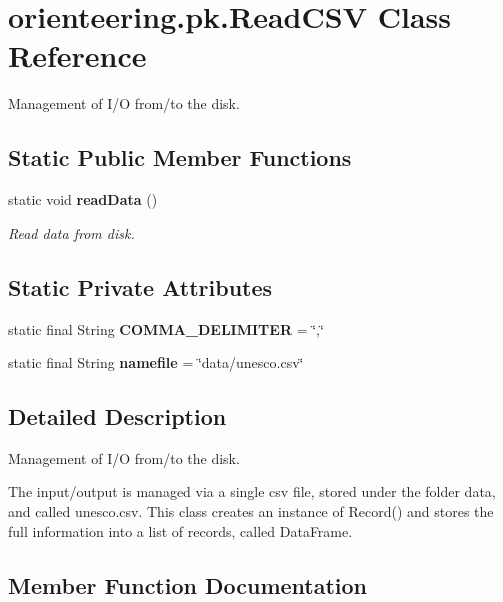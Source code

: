 \section{orienteering.\+pk.\+Read\+C\+SV Class Reference}
\label{classorienteering_1_1pk_1_1ReadCSV}


Management of I/O from/to the disk.  


\subsection*{Static Public Member Functions}
\begin{DoxyCompactItemize}
\item 
static void \textbf{ read\+Data} ()
\begin{DoxyCompactList}\small\item\em Read data from disk. \end{DoxyCompactList}\end{DoxyCompactItemize}
\subsection*{Static Private Attributes}
\begin{DoxyCompactItemize}
\item 
static final String \textbf{ C\+O\+M\+M\+A\+\_\+\+D\+E\+L\+I\+M\+I\+T\+ER} = \char`\"{},\char`\"{}
\item 
static final String \textbf{ namefile} = \char`\"{}data/unesco.\+csv\char`\"{}
\end{DoxyCompactItemize}


\subsection{Detailed Description}
Management of I/O from/to the disk. 

The input/output is managed via a single csv file, stored under the folder data, and called {\ttfamily unesco.\+csv}. This class creates an instance of Record() and stores the full information into a list of records, called Data\+Frame. 

\subsection{Member Function Documentation}
\mbox{\label{classorienteering_1_1pk_1_1ReadCSV_aa16e4c5fea57ffb0f63e667b14e28103}} 
